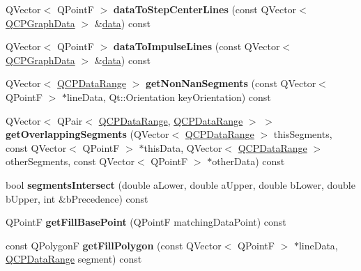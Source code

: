 \begin{DoxyCompactItemize}
\item 
Q\+Vector$<$ Q\+PointF $>$ {\bfseries data\+To\+Step\+Center\+Lines} (const Q\+Vector$<$ \hyperlink{classQCPGraphData}{Q\+C\+P\+Graph\+Data} $>$ \&\hyperlink{classQCPGraph_a04514a2b1fb61a280ead66abe80b89ab}{data}) const \hypertarget{classQCPGraph_a2ad792d49fc4b613c1fc05544f530ef8}{}\label{classQCPGraph_a2ad792d49fc4b613c1fc05544f530ef8}

\item 
Q\+Vector$<$ Q\+PointF $>$ {\bfseries data\+To\+Impulse\+Lines} (const Q\+Vector$<$ \hyperlink{classQCPGraphData}{Q\+C\+P\+Graph\+Data} $>$ \&\hyperlink{classQCPGraph_a04514a2b1fb61a280ead66abe80b89ab}{data}) const \hypertarget{classQCPGraph_a0aa76bf06582287c7ab3f32a83fd94f1}{}\label{classQCPGraph_a0aa76bf06582287c7ab3f32a83fd94f1}

\item 
Q\+Vector$<$ \hyperlink{classQCPDataRange}{Q\+C\+P\+Data\+Range} $>$ {\bfseries get\+Non\+Nan\+Segments} (const Q\+Vector$<$ Q\+PointF $>$ $\ast$line\+Data, Qt\+::\+Orientation key\+Orientation) const \hypertarget{classQCPGraph_a65584642f9fceae585c4e54a295242c1}{}\label{classQCPGraph_a65584642f9fceae585c4e54a295242c1}

\item 
Q\+Vector$<$ Q\+Pair$<$ \hyperlink{classQCPDataRange}{Q\+C\+P\+Data\+Range}, \hyperlink{classQCPDataRange}{Q\+C\+P\+Data\+Range} $>$ $>$ {\bfseries get\+Overlapping\+Segments} (Q\+Vector$<$ \hyperlink{classQCPDataRange}{Q\+C\+P\+Data\+Range} $>$ this\+Segments, const Q\+Vector$<$ Q\+PointF $>$ $\ast$this\+Data, Q\+Vector$<$ \hyperlink{classQCPDataRange}{Q\+C\+P\+Data\+Range} $>$ other\+Segments, const Q\+Vector$<$ Q\+PointF $>$ $\ast$other\+Data) const \hypertarget{classQCPGraph_ab0d7cc3285a3b42e735aaeb953ab7d83}{}\label{classQCPGraph_ab0d7cc3285a3b42e735aaeb953ab7d83}

\item 
bool {\bfseries segments\+Intersect} (double a\+Lower, double a\+Upper, double b\+Lower, double b\+Upper, int \&b\+Precedence) const \hypertarget{classQCPGraph_a5dad4a556464c8fa8635a560b3e00a6d}{}\label{classQCPGraph_a5dad4a556464c8fa8635a560b3e00a6d}

\item 
Q\+PointF {\bfseries get\+Fill\+Base\+Point} (Q\+PointF matching\+Data\+Point) const \hypertarget{classQCPGraph_a5ea875197f4988c6fdf314259321566f}{}\label{classQCPGraph_a5ea875197f4988c6fdf314259321566f}

\item 
const Q\+PolygonF {\bfseries get\+Fill\+Polygon} (const Q\+Vector$<$ Q\+PointF $>$ $\ast$line\+Data, \hyperlink{classQCPDataRange}{Q\+C\+P\+Data\+Range} segment) const \hypertarget{classQCPGraph_a48e9318abd259a1f800f2ccca718785f}{}\label{classQCPGraph_a48e9318abd259a1f800f2ccca718785f}


\end{DoxyCompactItemize}
